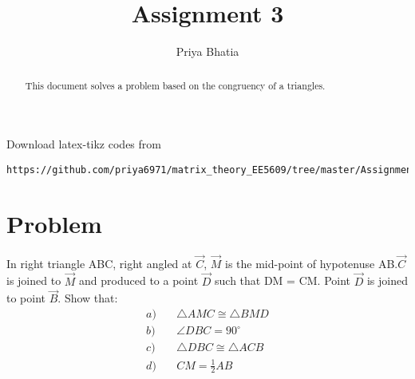 \documentclass[journal,12pt,twocolumn]{IEEEtran}
\begin{document}
     \def\rightbox#1{\makebox[0in][r]{#1}}
     \def\centbox#1{\makebox[0in]{#1}}
     \def\topbox#1{\raisebox{-\baselineskip}[0in][0in]{#1}}
     \def\midbox#1{\raisebox{-0.5\baselineskip}[0in][0in]{#1}}
\vspace{3cm}
\title{Assignment 3}
\author{Priya Bhatia}
\maketitle
\newpage
\bigskip
\renewcommand{\thefigure}{\theenumi}
\renewcommand{\thetable}{\theenumi}
\begin{abstract}
This document solves a problem based on the congruency of a triangles.
\end{abstract}
%
Download latex-tikz codes from 
%
\begin{lstlisting}
https://github.com/priya6971/matrix_theory_EE5609/tree/master/Assignment3
\end{lstlisting}
%
\section{Problem}
In right triangle ABC, right angled at $\vec{C}$, $\vec{M}$ is the mid-point of hypotenuse AB.$\vec{C}$ is joined to $\vec{M}$ and produced to a point $\vec{D}$ such that DM = CM. Point $\vec{D}$ is joined to point $\vec{B}$. Show that:
\begin{align}
a) & \quad	\triangle AMC \cong \triangle BMD \\
b) & \quad \angle DBC = 90^{\circ} \\ 
c) & \quad \triangle DBC \cong \triangle ACB \\
d) & \quad CM = \frac{1}{2} AB
\end{align}
\end{document}
